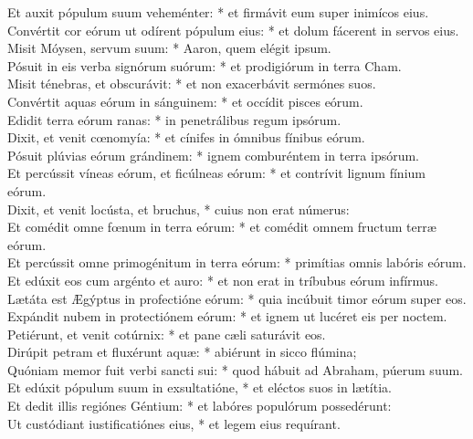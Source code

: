 {	Et auxit pópulum suum veheménter: * et firmávit eum super inimícos eius. \\
	Convértit cor eórum ut odírent pópulum eius: * et dolum fácerent in servos eius. \\
	Misit Móysen, servum suum: * Aaron, quem elégit ipsum. \\
	Pósuit in eis verba signórum suórum: * et prodigiórum in terra Cham. \\
	Misit ténebras, et obscurávit: * et non exacerbávit sermónes suos. \\
	Convértit aquas eórum in sánguinem: * et occídit pisces eórum. \\
	Edidit terra eórum ranas: * in penetrálibus regum ipsórum. \\
	Dixit, et venit cœnomyía: * et cínifes in ómnibus fínibus eórum. \\
	Pósuit plúvias eórum grándinem: * ignem comburéntem in terra ipsórum. \\
	Et percússit víneas eórum, et ficúlneas eórum: * et contrívit lignum fínium eórum. \\
	Dixit, et venit locústa, et bruchus, * cuius non erat númerus: \\
	Et comédit omne fœnum in terra eórum: * et comédit omnem fructum terræ eórum. \\
	Et percússit omne primogénitum in terra eórum: * primítias omnis labóris eórum. \\
	Et edúxit eos cum argénto et auro: * et non erat in tríbubus eórum infírmus. \\
	Lætáta est Ægýptus in profectióne eórum: * quia incúbuit timor eórum super eos. \\
	Expándit nubem in protectiónem eórum: * et ignem ut lucéret eis per noctem. \\
	Petiérunt, et venit cotúrnix: * et pane cæli saturávit eos. \\
	Dirúpit petram et fluxérunt aquæ: * abiérunt in sicco flúmina; \\
	Quóniam memor fuit verbi sancti sui: * quod hábuit ad Abraham, púerum suum. \\
	Et edúxit pópulum suum in exsultatióne, * et eléctos suos in lætítia. \\
	Et dedit illis regiónes Géntium: * et labóres populórum possedérunt: \\
	Ut custódiant iustificatiónes eius, * et legem eius requírant. \\
}

